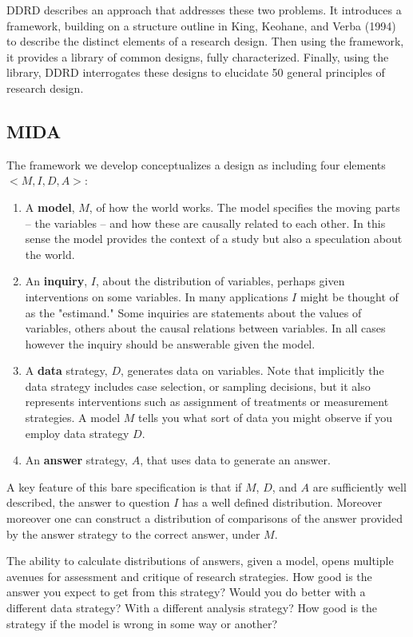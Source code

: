 \documentclass[11pt]{article}
\begin{document}
DDRD describes an approach that addresses these two problems. It introduces a framework, building on a structure outline in King, Keohane, and Verba (1994) to describe the distinct elements of a research design. Then using the framework, it provides a library of common designs, fully characterized. Finally, using the library, DDRD interrogates these designs to elucidate 50 general principles of research design.

\subsection{MIDA}
The framework we develop conceptualizes a design as including four elements $<M,I,D,A>$:
\begin{enumerate}
	
	\item A \textbf{model}, $M$, of how the world works. The model specifies the moving parts -- the variables -- and how these are causally related to each other. In this sense the model provides the context of a study but also a speculation about the world.    
	\item An \textbf{inquiry}, $I$, about the distribution of variables, perhaps given interventions on some variables.  In many applications $I$ might be thought of as the "estimand." Some inquiries are statements about the values of variables, others about the causal relations between variables. In all cases however the inquiry should be answerable given the model.   
	\item A \textbf{data} strategy, $D$, generates data on variables.  Note that implicitly the data strategy includes case selection, or sampling decisions, but it also represents interventions such as assignment of treatments or measurement strategies. A model $M$ tells you what sort of data you might observe if you employ data strategy $D$.  
	\item An \textbf{answer} strategy, $A$, that uses data to generate an answer.  
\end{enumerate}

A key feature of this bare specification is that if $M$, $D$, and $A$ are sufficiently well described, the answer to question $I$ has a well defined distribution. Moreover moreover one can construct a distribution of comparisons of the answer provided by the answer strategy to the correct answer, under $M$.

The ability to calculate distributions of answers, given a model, opens multiple avenues for assessment and critique of research strategies. How good is the answer you expect to get from this strategy? Would you do better with a different data strategy? With a different analysis strategy? How good is the strategy if the model is wrong in some way or another? 
\end{document}

